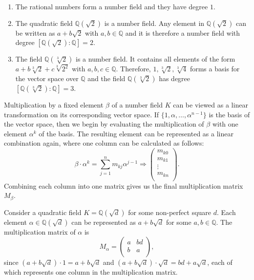 \begin{example}
  \hfill
  \begin{enumerate}
    \item The rational numbers form a number field and they have degree $1$.
    \item The quadratic field $ℚ(\sqrt{2})$ is a number field.
      Any element in $ ℚ(\sqrt{2})$ can be written as $a + b \sqrt{2}$ with $a,b ∈ ℚ$
      and it is therefore a number field with degree $[ℚ(\sqrt{2}) : ℚ] = 2$.
    \item The field $ℚ(\sqrt[3]{2})$ is a number field.
      It contains all elements of the form $a + b \sqrt[3]{2} + c \sqrt[3]{2^2}$ with $a,b,c ∈ ℚ$.
      Therefore, $1, \sqrt[3]{{2}}, \sqrt[3]{4}$ forms a basis for the vector space over $ℚ$
      and the field $ℚ(\sqrt[3]{2})$ has degree $[ℚ(\sqrt[3]{2}) : ℚ] = 3$.
  \end{enumerate}
\end{example}

Multiplication by a fixed element $β$ of a number field $K$ can be viewed as a
linear transformation on its corresponding vector space.
If $\{1, α, …, α^{n-1}\}$ is the basis of the vector space, then we begin by
evaluating the multiplication of $β$ with one element $α^k$ of the basis.
The resulting element can be represented as a linear combination again,
where one column can be calculated as follows:
\[
  β · α^k = \sum_{j=1}^{n} m_{kj} α^{j-1} \Rightarrow
  \begin{pmatrix}
    m_{k0} \\
    m_{k1} \\
    ⋮ \\
    m_{kn} \\
  \end{pmatrix}.
\]
Combining each column into one matrix gives us the final multiplication matrix $M_β$.

\begin{example}
  \label{ex:mult-matrix}
  Consider a quadratic field $K = ℚ(\sqrt{d})$ for some non-perfect square $d$.
  Each element $α ∈ ℚ(\sqrt{d})$ can be represented as $a + b \sqrt{d}$ for some $a, b ∈ ℚ$.
  The multiplication matrix of $α$ is
  \[
    M_α =
    \begin{pmatrix}
      a & bd \\
      b & a \\
    \end{pmatrix},
  \]
  since
  $(a + b \sqrt{d}) · 1 = a + b \sqrt{d}$ and
  $(a + b \sqrt{d}) · \sqrt{d} = bd + a \sqrt{d}$,
  each of which represents one column in the multiplication matrix.
\end{example}

